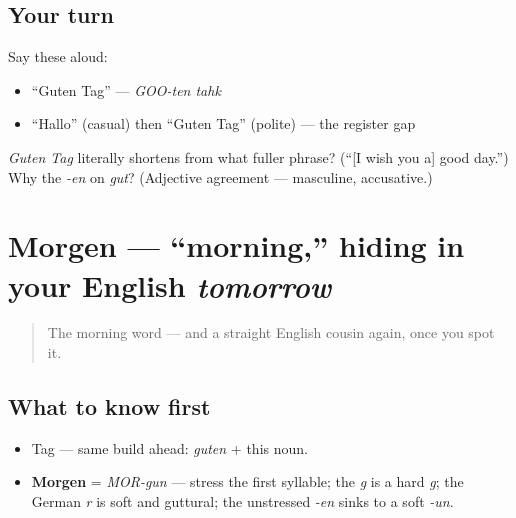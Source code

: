 \subsection*{Your turn}
Say these aloud:

\begin{itemize}
\raggedright
  \item \textquotedblleft{}Guten Tag\textquotedblright{} — \emph{GOO-ten tahk}
  \item \textquotedblleft{}Hallo\textquotedblright{} (casual) then \textquotedblleft{}Guten Tag\textquotedblright{} (polite) — the register gap
\end{itemize}

\begin{tcolorbox}[breakable,colback=teal!4,colframe=teal!35!black,title={Before you move on}]
\emph{Guten Tag} literally shortens from what fuller phrase? (\textquotedblleft{}{[}I wish you a{]} good day.\textquotedblright{}) Why the \emph{-en} on \emph{gut}? (Adjective agreement — masculine, accusative.)
\end{tcolorbox}
\section[Morgen]{Morgen — \textquotedblleft{}morning,\textquotedblright{} hiding in your English \emph{tomorrow}}

\label{lesson:GE-C01-morgen}



\begin{quote}
The morning word — and a straight English cousin again, once you spot it.
\end{quote}

\subsection*{What to know first}
\begin{itemize}
\raggedright
  \item Tag — same build ahead: \emph{guten} + this noun.
\end{itemize}

\begin{sounds}
\begin{itemize}
\raggedright
  \item \textbf{Morgen} = \emph{MOR-gun} — stress the first syllable; the \emph{g} is a hard \emph{g}; the German \emph{r} is soft and guttural; the unstressed \emph{-en} sinks to a soft \emph{-un}.
\end{itemize}
\end{sounds}


